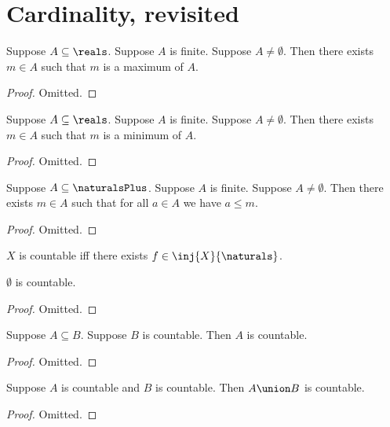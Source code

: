 \section{Cardinality, revisited} 

\begin{lemma}\label{finite_real_maximum}
    Suppose $A\subseteq\reals$.
    Suppose $A$ is finite.
    Suppose $A\neq \emptyset$.
    Then there exists $m\in A$ such that $m$ is a maximum of $A$.
\end{lemma}
\begin{proof}
    Omitted.
\end{proof}

\begin{lemma}\label{finite_real_minimum}
    Suppose $A\subseteq\reals$.
    Suppose $A$ is finite.
    Suppose $A\neq \emptyset$.
    Then there exists $m\in A$ such that $m$ is a minimum of $A$.
\end{lemma}
\begin{proof}
    Omitted.
\end{proof}

\begin{lemma}\label{finite_naturals_maximum}
    Suppose $A\subseteq\naturalsPlus$.
    Suppose $A$ is finite.
    Suppose $A\neq \emptyset$.
    Then there exists $m\in A$ such that for all $a\in A$ we have $a \leq m$.
\end{lemma}
\begin{proof}
    Omitted.
\end{proof}

\begin{definition}\label{countable}
    $X$ is countable iff there exists $f\in\inj{X}{\naturals}$.
\end{definition}

\begin{lemma}\label{emptyset_is_countable}
    $\emptyset$ is countable.
\end{lemma}
\begin{proof}
   Omitted.
\end{proof}

\begin{lemma}\label{subseteq_countable_is_countable}
    Suppose $A\subseteq B$.
    Suppose $B$ is countable.
    Then $A$ is countable.
\end{lemma}
\begin{proof}
    Omitted.
\end{proof}

\begin{lemma}\label{union_of_countable_is_countable}
    Suppose $A$ is countable and $B$ is countable.
    Then $A\union B$ is countable.
\end{lemma}
\begin{proof}
    Omitted.
\end{proof}


